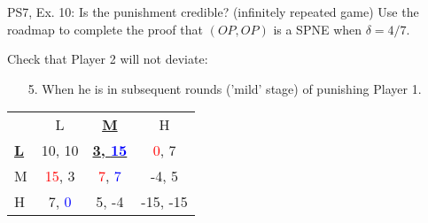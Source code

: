 \begin{frame}{PS7, Ex. 10: Is the punishment credible? (infinitely repeated game)}
  Use the roadmap to complete the proof that $(OP,OP)$ is a SPNE when $\delta=4/7$.\vspace{-4pt}
  \begin{multicols}{2}
    Check that Player 2 will not deviate:
    \begin{itemize}
      \item[5.] When he is in subsequent rounds ('mild' stage) of punishing Player 1.
    \end{itemize}
    \vfill\null\columnbreak
    \vspace{-6pt}
    \begin{table}
      \begin{tabular}{l|c|c|c|}
        \multicolumn{1}{c}{} & \multicolumn{1}{c}{L} & \multicolumn{1}{c}{\textbf{\underline{M}}} & \multicolumn{1}{c}{H} \\\cline{2-4}
        \textbf{\underline{L}} & 10, 10 & \textbf{\underline{3, \textcolor{blue}{15}}} & \textcolor{red}{0}, 7 \\\cline{2-4}
        M & \textcolor{red}{15}, 3 & \textcolor{red}{7}, \textcolor{blue}{7} & -4, 5 \\\cline{2-4}
        H & 7, \textcolor{blue}{0} & 5, -4 & -15, -15 \\\cline{2-4}
      \end{tabular}
    \end{table}
    \vfill\null
  \end{multicols}
    \vfill\null
\end{frame}
